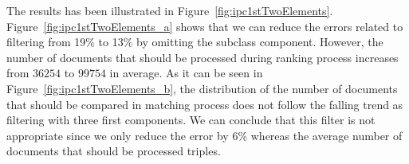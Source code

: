 The results has been illustrated in Figure~\ref{fig:ipc1stTwoElements}. Figure~\ref{fig:ipc1stTwoElements_a} shows that we can reduce the errors related to filtering from 19\% to 13\% by omitting the subclass component. However, the number of documents that should be processed during ranking process increases from $ 36254 $ to $ 99754 $ in average. As it can be seen in Figure~\ref{fig:ipc1stTwoElements_b}, the distribution of the number of documents that should be compared in matching process does not follow the falling trend as filtering with three first components. We can conclude that this filter is not appropriate since we only reduce the error by 6\% whereas the average number of documents that should be processed triples.    
